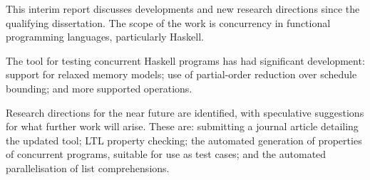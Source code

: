 This interim report discusses developments and new research directions
since the qualifying dissertation. The scope of the work is
concurrency in functional programming languages, particularly Haskell.

The \dejafu{} tool for testing concurrent Haskell programs has had
significant development: support for relaxed memory models; use of
partial-order reduction over schedule bounding; and more supported
operations.

Research directions for the near future are identified, with
speculative suggestions for what further work will arise. These are:
submitting a journal article detailing the updated \dejafu{} tool; LTL
property checking; the automated generation of properties of
concurrent programs, suitable for use as test cases; and the automated
parallelisation of list comprehensions.
